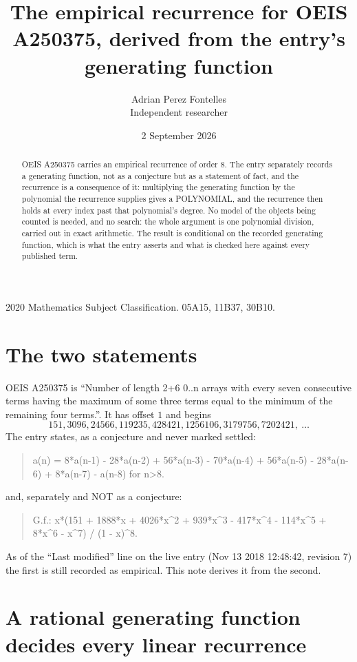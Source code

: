 \documentclass[11pt,a4paper]{article}
\title{The empirical recurrence for OEIS A250375, derived from the entry's generating function}
\author{Adrian Perez Fontelles\\ \small Independent researcher}
\date{2 September 2026}
\theoremstyle{plain}
\theoremstyle{definition}
\begin{document}
\maketitle

\begin{abstract}
OEIS A250375 carries an empirical recurrence of order $8$. The entry separately records a
generating function, not as a conjecture but as a statement of fact, and the recurrence is a
consequence of it: multiplying the generating function by the polynomial the recurrence
supplies gives a POLYNOMIAL, and the recurrence then holds at every index past that
polynomial's degree. No model of the objects being counted is needed, and no search: the
whole argument is one polynomial division, carried out in exact arithmetic. The result is
conditional on the recorded generating function, which is what the entry asserts and what is
checked here against every published term.
\end{abstract}

\noindent\small 2020 Mathematics Subject Classification. 05A15, 11B37, 30B10.\normalsize

\section{The two statements}

OEIS A250375 is ``Number of length 2+6 0..n arrays with every seven consecutive terms having the maximum of some three terms equal to the minimum of the remaining four terms.''. It has offset $1$ and begins
\[
151, 3096, 24566, 119235, 428421, 1256106, 3179756, 7202421,\ \dots
\]
The entry states, as a conjecture and never marked settled:
\begin{quote}
a(n) = 8*a(n-1) - 28*a(n-2) + 56*a(n-3) - 70*a(n-4) + 56*a(n-5) - 28*a(n-6) + 8*a(n-7) - a(n-8) for n>8.
\end{quote}
and, separately and NOT as a conjecture:
\begin{quote}
G.f.: x*(151 + 1888*x + 4026*x\^{}2 + 939*x\^{}3 - 417*x\^{}4 - 114*x\^{}5 + 8*x\^{}6 - x\^{}7) / (1 - x)\^{}8.
\end{quote}
As of the ``Last modified'' line on the live entry (Nov 13 2018 12:48:42, revision 7) the first is still
recorded as empirical. This note derives it from the second.

\section{A rational generating function decides every linear recurrence}
\end{document}
